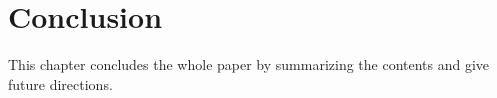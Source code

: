 \documentclass [11pt, proquest] {uwthesis}[2020/02/24]
\begin{document}


    

\chapter{Conclusion}
This chapter concludes the whole paper by summarizing the contents and give future directions.
\end{document}
